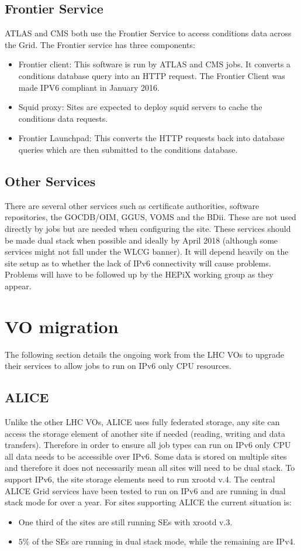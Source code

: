 \documentclass[a4paper]{jpconf}
\begin{document}
\subsection{Frontier Service}
ATLAS and CMS both use the Frontier Service\cite{Frontier} to access conditions data across the Grid. The Frontier service has three components:
\begin{itemize}
\item Frontier client: This software is run by ATLAS and CMS jobs. It converts a conditions database query into an HTTP request. The Frontier Client was made IPV6 compliant in January 2016.
\item Squid proxy: Sites are expected to deploy squid servers to cache the conditions data requests.
\item Frontier Launchpad: This converts the HTTP requests back into database queries which are then submitted to the conditions database.
\end{itemize}

\subsection{Other Services}
There are several other services such as certificate authorities, software repositories, the GOCDB/OIM, GGUS, VOMS and the BDii.  These are not used directly by jobs but are needed when configuring the site.  These services should be made dual stack when possible and ideally by April 2018 (although some services might not fall under the WLCG banner).   It will depend heavily on the site setup as to whether the lack of IPv6 connectivity will cause problems.  Problems will have to be followed up by the HEPiX working group as they appear. 


\section{VO migration}
The following section details the ongoing work from the LHC VOs to upgrade their services to allow jobs to run on IPv6 only CPU resources.

\subsection{ALICE}
Unlike the other LHC VOs, ALICE uses fully federated storage, any site can access the storage element of another site if needed (reading, writing and data transfers).  Therefore in order to ensure all job types can run on IPv6 only CPU all data needs to be accessible over IPv6.  Some data is stored on multiple sites and therefore it does not necessarily mean all sites will need to be dual stack.  To support IPv6, the site storage elements need to run xrootd v.4.  The central ALICE Grid services have been tested to run on IPv6 and are running in dual stack mode for over a year.  For sites supporting ALICE the current situation is:
\begin{itemize}
\item One third of the sites are still running SEs with xrootd v.3.
\item $5\%$ of the SEs are running in dual stack mode, while the remaining are IPv4.
\end{itemize}
\end{document}
